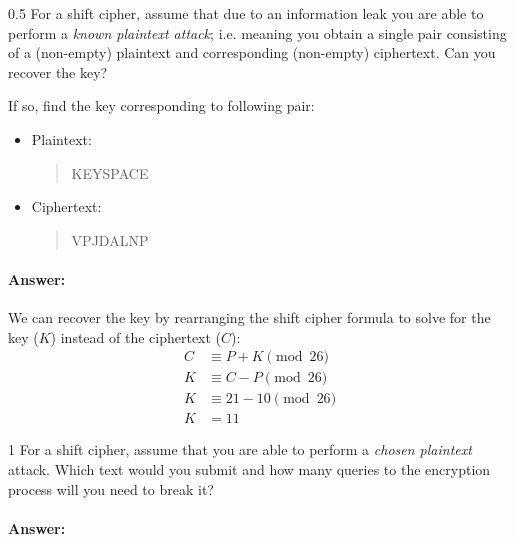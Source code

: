 \documentclass[]{scrartcl}
\newcounter{exercise}
\newcounter{qid}[section]
\newcommand{\exerciseprefix}{prefix}
\newcommand{\questiontitle}{Questions}
\newcommand{\blockid}{B2}
\newcommand{\exname}{}
\begin{document}
\renewcommand{\exerciseprefix}{PS-\blockid{}-E\theexercise: \exname{}-Q\theqid}
\renewcommand{\questiontitle}{\exerciseprefix{}: Attacking shift cipher}
\begin{exercisebox}{0.5}
  For a shift cipher, assume that due to an information leak you are able to perform a \emph{known plaintext attack}; i.e. meaning you obtain a single pair consisting of a (non-empty) plaintext and corresponding (non-empty) ciphertext. Can you recover the key?

  If so, find the key corresponding to following pair:
  \begin{itemize}
      \item Plaintext:
      \begin{quote}
          KEYSPACE
      \end{quote}
      \item Ciphertext:
      \begin{quote}
          VPJDALNP
      \end{quote}
  \end{itemize}
\end{exercisebox}

\paragraph{Answer:} 

We can recover the key by rearranging the shift cipher formula to solve for the key ($K$) instead of the ciphertext ($C$):
\begin{align*}
    C &\equiv P + K \pmod{26} \\
    K &\equiv C - P \pmod{26} \\
    K &\equiv 21 - 10 \pmod{26} \\
    K &= 11
\end{align*}



\renewcommand{\exerciseprefix}{PS-\blockid{}-E\theexercise: \exname{}-Q\theqid}
\renewcommand{\questiontitle}{\exerciseprefix{}: Attacking shift cipher}
\begin{exercisebox}{1}
  For a shift cipher, assume that you are able to perform a \emph{chosen plaintext} attack. Which text would you submit and how many queries to the encryption process will you need to break it?
\end{exercisebox}

\paragraph{Answer:} 
\end{document}
